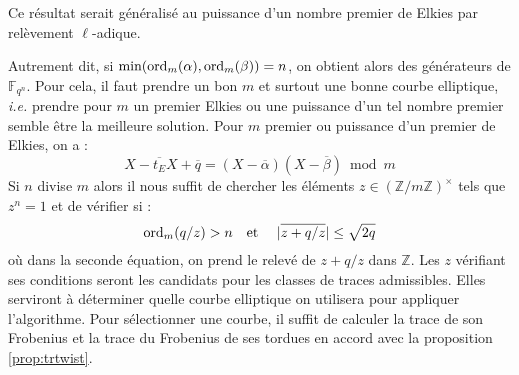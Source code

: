 \documentclass[a4paper]{article} %
\numberwithin{section}{part}
\numberwithin{equation}{section}
\newcommand\zmodninv[1]{(\mathbb{Z}/#1\mathbb{Z})^{\times}}
\newcommand\GF[1]{\mathbb{F}_{#1}}
\newcommand\ZZ{\mathbb{Z}}
\newcommand\etmath{\textup{\quad et \quad}}
\newcommand\ord[2]{\textup{ord}_{#1}(#2)}
\begin{document}
Ce résultat serait généralisé au
puissance d'un nombre premier de Elkies par relèvement $\ell$-adique.\par 
Autrement dit, si $\textup{min}(\ord{m}{\alpha},\ord{m}{\beta}) = n$, on obtient
alors des générateurs de $\GF{q^n}$. Pour cela, il faut prendre un bon $m$ et
surtout une bonne courbe elliptique, \emph{i.e.} prendre pour $m$ un premier
Elkies ou une puissance d'un tel nombre premier semble être la meilleure
solution. Pour $m$ premier ou puissance d'un premier de Elkies, on a :
\begin{equation}
X - \overline{t_E}X + \overline{q} = (X - \overline{\alpha})(X -
\overline{\beta})\bmod m
\end{equation}
Si $n$ divise $m$ alors il nous suffit de chercher les éléments
$z\in\zmodninv{m}$ tels que $z^n = 1$ et de vérifier si :
\begin{equation}
\ord{m}{q/z} > n \etmath \vert{\overline{z + q/z}}\vert\leq\sqrt{2q}
\end{equation}
où dans la seconde équation, on prend le relevé de $z + q/z$ dans $\ZZ$. Les $z$
vérifiant ses conditions seront les candidats pour les classes de traces
admissibles. Elles serviront à déterminer quelle courbe elliptique on utilisera
pour appliquer l'algorithme. Pour sélectionner une courbe, il suffit de calculer
la trace de son Frobenius et la trace du Frobenius de ses tordues en accord avec
la proposition \ref{prop:trtwist}.
\end{document}

